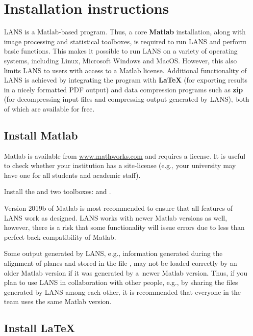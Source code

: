 \section{Installation instructions}

LANS is a Matlab-based program. Thus, a core \textbf{Matlab} installation, along with image processing and statistical toolboxes, is required to run LANS and perform basic functions. This makes it possible to run LANS on a variety of operating systems, including Linux, Microsoft Windows and MacOS. However, this also limits LANS to users with access to a Matlab license. Additional functionality of LANS is achieved by integrating the program with \textbf{\LaTeX} (for exporting results in a nicely formatted PDF output) and data compression programs such as \textbf{zip} (for decompressing input files and compressing output generated by LANS), both of which are available for free.


\subsection{Install Matlab}
\setcounter{step}{0}

\goldbox{}
Matlab is available from \url{www.mathworks.com} and requires a license. It is useful to check whether your institution has a site-license (e.g., your university may have one for all students and academic staff). 
\tcbe

\s Install the  and two toolboxes:  and . 

\nb\bul Version 2019b of Matlab is most recommended to ensure that all features of LANS work as designed. LANS works with newer Matlab versions as well, however, there is a risk that some functionality will issue errors due to less than perfect back-compatibility of Matlab.

\bul Some output generated by LANS, e.g., information generated during the alignment of planes and stored in the file , may not be loaded correctly by an older Matlab version if it was generated by a~newer Matlab version. Thus, if you plan to use LANS in collaboration with other people, e.g., by sharing the files generated by LANS among each other, it is recommended that everyone in the team uses the same Matlab version.


\subsection{Install \LaTeX}
\setcounter{step}{0}


